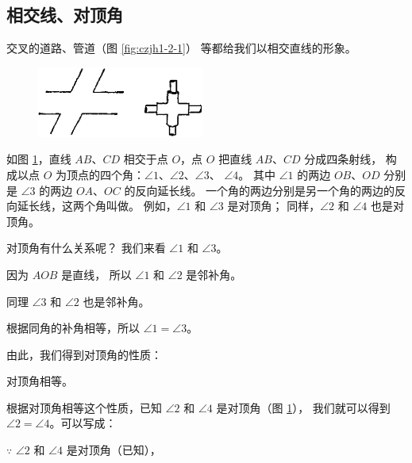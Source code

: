 \subsection{相交线、对顶角}\label{subsec:czjh1-2-1}

交叉的道路、管道（图 \ref{fig:czjh1-2-1}） 等都给我们以相交直线的形象。

\begin{figure}[htbp]
    \centering
    \begin{minipage}[b]{7cm}
        \centering
        \includegraphics[width=5.5cm]{../pic/czjh1-ch2-01.png}
        \caption{}\label{fig:czjh1-2-1}
    \end{minipage}
    \qquad
    \begin{minipage}[b]{7cm}
        \centering
        
        \caption{}\label{fig:czjh1-2-2}
    \end{minipage}
\end{figure}


如图 \ref{fig:czjh1-2-2}，直线 $AB$、$CD$ 相交于点 $O$，点 $O$ 把直线 $AB$、$CD$ 分成四条射线，
构成以点 $O$ 为顶点的四个角：$\angle 1$、$\angle 2$、$\angle 3$、 $\angle 4$。
其中 $\angle 1$ 的两边 $OB$、$OD$ 分别是 $\angle 3$ 的两边 $OA$、$OC$ 的反向延长线。
一个角的两边分别是另一个角的两边的反向延长线，这两个角叫做。
例如，$\angle 1$ 和 $\angle 3$ 是对顶角； 同样，$\angle 2$ 和 $\angle 4$ 也是对顶角。

对顶角有什么关系呢？ 我们来看 $\angle 1$ 和 $\angle 3$。

因为 $AOB$ 是直线， 所以 $\angle 1$ 和 $\angle 2$ 是邻补角。

同理 $\angle 3$ 和 $\angle 2$ 也是邻补角。

根据同角的补角相等，所以 $\angle 1 = \angle 3$。

由此，我们得到对顶角的性质：

\begin{xingzhi}
    对顶角相等。
\end{xingzhi}

根据对顶角相等这个性质，已知 $\angle 2$ 和 $\angle 4$ 是对顶角（图 \ref{fig:czjh1-2-2}），
我们就可以得到 $\angle 2 = \angle 4$。可以写成：

$\because$ \quad $\angle 2$ 和 $\angle 4$ 是对顶角（已知），

